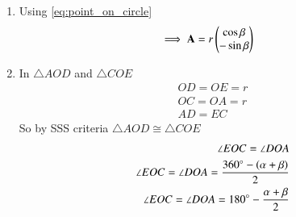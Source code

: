 \begin{enumerate}[label=\thesection.\arabic*.,ref=\thesection.\theenumi]
\item Using \ref{eq:point_on_circle}
\begin{align}
\implies \mathbf{A} &= r\begin{pmatrix}\cos \beta \\ -\sin \beta\end{pmatrix}
\label{eq:constr_a}
\end{align}
%

\item In $\triangle AOD$ and $\triangle COE$
\begin{align}
OD = OE = r
\\
OC = OA = r
\\
AD = EC 
\end{align}
So by SSS criteria $\triangle AOD \cong \triangle COE$
\begin{align}
\angle EOC = \angle DOA
\\
\angle EOC = \angle DOA = \frac{360^{\circ}-\left(\alpha+\beta\right)}{2}
\\
\angle EOC = \angle DOA = 180^{\circ}-\frac{\alpha+\beta}{2}
\label{eq:equalangles}
\end{align}


\end{enumerate}
